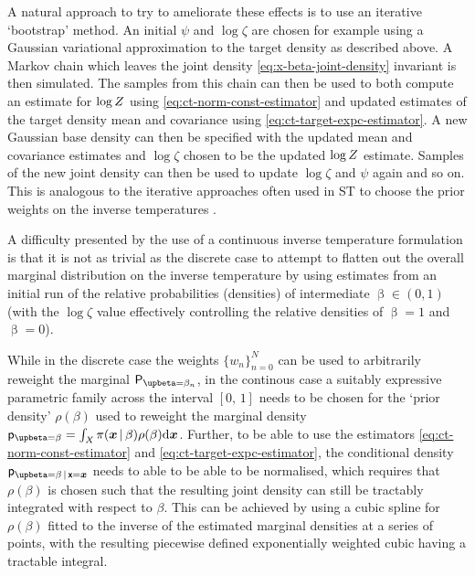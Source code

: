 A natural approach to try to ameliorate these effects is to use an iterative `bootstrap' method. An initial $\psi$ and $\log \zeta$ are chosen for example using a Gaussian variational approximation to the target density as described above. A Markov chain which leaves the joint density \eqref{eq:x-beta-joint-density} invariant is then simulated. The samples from this chain can then be used to both compute an estimate for $\log Z$ using \eqref{eq:ct-norm-const-estimator} and updated estimates of the target density mean and covariance using \eqref{eq:ct-target-expc-estimator}. A new Gaussian base density can then be specified with the updated mean and covariance estimates and $\log \zeta$ chosen to be the updated $\log Z$ estimate. Samples of the new joint density can then be used to update $\log \zeta$ and $\psi$ again and so on. This is analogous to the iterative approaches often used in \ac{ST} to choose the prior weights on the inverse temperatures \citep{geyer1995annealing,carlson2016partition}. 

A difficulty presented by the use of a continuous inverse temperature formulation is that it is not as trivial as the discrete case to attempt to flatten out the overall marginal distribution on the inverse temperature by using estimates from an initial run of the relative probabilities (densities) of intermediate $\upbeta \in (0, 1)$ (with the $\log \zeta$ value effectively controlling the relative densities of $\upbeta = 1$ and $\upbeta = 0$). 

While in the discrete case the weights $\lbrace w_n \rbrace_{n=0}^N$ can be used to arbitrarily reweight the marginal $\prob{\upbeta = \beta_n}$, in the continous case a suitably expressive parametric family across the interval $[0,\,1]$ needs to be chosen for the `prior density' $\rho(\beta)$ used to reweight the marginal density $\pden{\upbeta = \beta} = \int_{\set{X}} \pi(\vct{x}\gvn\beta)\rho(\beta)\dr\vct{x}$. Further, to be able to use the estimators \eqref{eq:ct-norm-const-estimator} and \eqref{eq:ct-target-expc-estimator}, the conditional density $\pden{\upbeta=\beta\gvn\rvct{x}=\vct{x}}$ needs to able to be able to be normalised, which requires that $\rho(\beta)$ is chosen such that the resulting joint density can still be tractably integrated with respect to $\beta$. This can be achieved by using a cubic spline for $\rho(\beta)$ fitted to the inverse of the estimated marginal densities at a series of points, with the resulting piecewise defined exponentially weighted cubic having a tractable integral.

